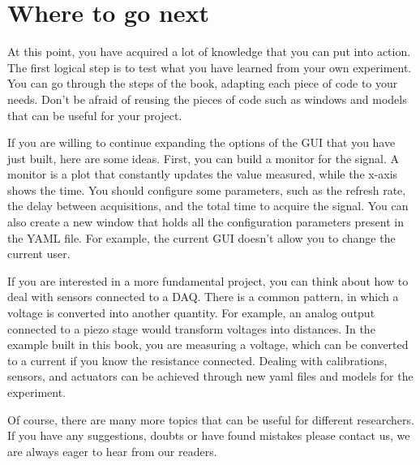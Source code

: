 \section{Where to go next}\label{where-to-gonext}
At this point, you have acquired a lot of knowledge that you can put
into action. The first logical step is to test what you have learned
from your own experiment. You can go through the steps of the book,
adapting each piece of code to your needs. Don't be afraid of reusing
the pieces of code such as windows and models that can be useful for
your project.

If you are willing to continue expanding the options of the {GUI} that
you have just built, here are some ideas. First, you can build a monitor
for the signal. A monitor is a plot that constantly updates the value
measured, while the x-axis shows the time. You should configure some
parameters, such as the refresh rate, the delay between acquisitions,
and the total time to acquire the signal. You can also create a new
window that holds all the configuration parameters present in the {YAML}
file. For example, the current {GUI} doesn't allow you to change the
current user.

If you are interested in a more fundamental project, you can think about
how to deal with sensors connected to a {DAQ}. There is a common
pattern, in which a voltage is converted into another quantity. For
example, an analog output connected to a piezo stage would transform
voltages into distances. In the example built in this book, you are
measuring a voltage, which can be converted to a current if you know the
resistance connected. Dealing with calibrations, sensors, and actuators
can be achieved through new yaml files and models for the experiment.

Of course, there are many more topics that can be useful for different
researchers. If you have any suggestions, doubts or have found mistakes
please contact us, we are always eager to hear from our readers.
